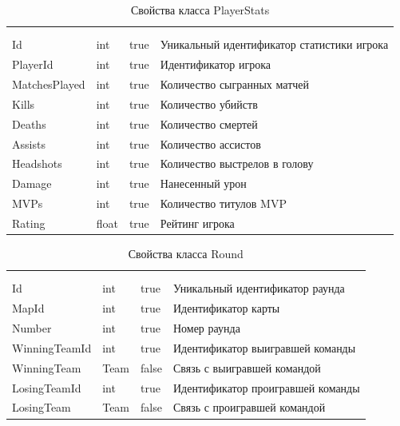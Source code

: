 \begin{xltabular}{\textwidth}{|X|X|X|X|}
	\caption{Свойства класса PlayerStats}\label{table:PlayerStats}\\ \hline
	 &  &  &  \\ \hline
	 &  &  &  \\ \hline
	\endfirsthead
	 \hline
	 &  &  &  \\ \hline
	\endhead
	Id & int & true & Уникальный идентификатор статистики игрока \\ \hline
	PlayerId & int & true & Идентификатор игрока \\ \hline
	MatchesPlayed & int & true & Количество сыгранных матчей \\ \hline
	Kills & int & true & Количество убийств \\ \hline
	Deaths & int & true & Количество смертей \\ \hline
	Assists & int & true & Количество ассистов \\ \hline
	Headshots & int & true & Количество выстрелов в голову \\ \hline
	Damage & int & true & Нанесенный урон \\ \hline
	MVPs & int & true & Количество титулов MVP \\ \hline
	Rating & float & true & Рейтинг игрока \\ \hline
\end{xltabular}

\begin{xltabular}{\textwidth}{|X|X|X|X|}
	\caption{Свойства класса Round}\label{table:Round}\\ \hline
	 &  &  &  \\ \hline
	 &  &  &  \\ \hline
	\endfirsthead
	 \hline
	 &  &  &  \\ \hline
	\endhead
	Id & int & true & Уникальный идентификатор раунда \\ \hline
	MapId & int & true & Идентификатор карты \\ \hline
	Number & int & true & Номер раунда \\ \hline
	WinningTeamId & int & true & Идентификатор выигравшей команды \\ \hline
	WinningTeam & Team & false & Связь с выигравшей командой \\ \hline
	LosingTeamId & int & true & Идентификатор проигравшей команды \\ \hline
	LosingTeam & Team & false & Связь с проигравшей командой \\ \hline
\end{xltabular}


